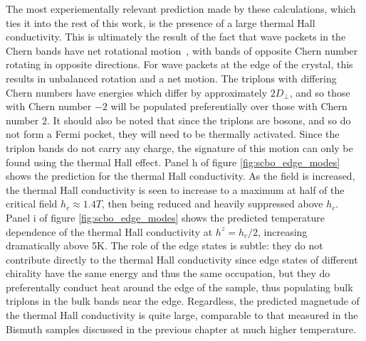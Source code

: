 \documentclass{thesis-umich}
\begin{document}
The most experiementally relevant prediction made by these calculations, which ties it into the rest of this work, is the presence of a large thermal Hall conductivity. This is ultimately the result of the fact that wave packets in the Chern bands have net rotational motion~\cite{Xiao2010}, with bands of opposite Chern number rotating in opposite directions. For wave packets at the edge of the crystal, this results in unbalanced rotation and a net motion. The triplons with differing Chern numbers have energies which differ by approximately $2D_\perp$, and so those with Chern number $-2$ will be populated preferentially over those with Chern number $2$. It should also be noted that since the triplons are bosons, and so do not form a Fermi pocket, they will need to be thermally activated. Since the triplon bands do not carry any charge, the signature of this motion can only be found using the thermal Hall effect. Panel h of figure \ref{fig:scbo_edge_modes} shows the prediction for the thermal Hall conductivity. As the field is increased, the thermal Hall conductivity is seen to increase to a maximum at half of the critical field $h_c \approx 1.4T$, then being reduced and heavily suppressed above $h_c$. Panel i of figure \ref{fig:scbo_edge_modes} shows the predicted temperature dependence of the thermal Hall conductivity at $h^z = h_c/2$, increasing dramatically above 5K. The role of the edge states is subtle: they do not contribute directly to the thermal Hall conductivity since edge states of different chirality have the same energy and thus the same occupation, but they do preferentally conduct heat around the edge of the sample, thus populating bulk triplons in the bulk bands near the edge. Regardless, the predicted magnetude of the thermal Hall conductivity is quite large, comparable to that measured in the Bismuth samples discussed in the previous chapter at much higher temperature.
\end{document}
